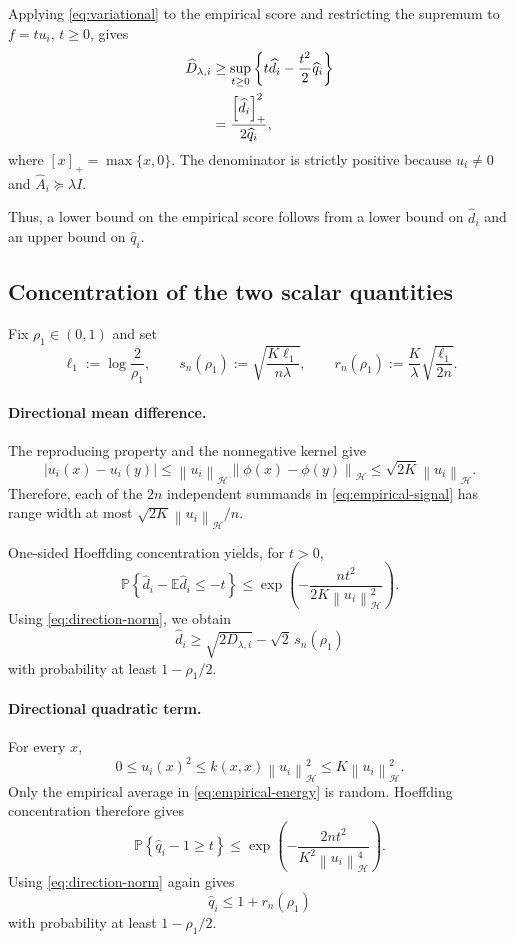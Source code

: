 \documentclass[11pt]{article}
\newcommand{\HH}{\mathcal H}
\newcommand{\E}{\mathbb E}
\newcommand{\Prob}{\mathbb P}
\newcommand{\norm}[1]{\left\lVert #1\right\rVert_{\HH}}
\newcommand{\pos}[1]{\left[#1\right]_+}
\begin{document}
Applying \eqref{eq:variational} to the empirical score
and restricting the supremum to $f=t u_i$, $t\ge0$, gives
\begin{align}
    \widehat D_{\lambda,i}
    &\ge
    \sup_{t\ge0}
    \left\{
        t\widehat d_i-\frac{t^2}{2}\widehat q_i
    \right\}
    \notag\\
    &=
    \frac{\pos{\widehat d_i}^2}{2\widehat q_i},
    \label{eq:directional-lower-bound}
\end{align}
where $[x]_+=\max\{x,0\}$.
The denominator is strictly positive because
$u_i\ne0$ and $\widehat A_i\succeq\lambda I$.

Thus, a lower bound on the empirical score follows from
a lower bound on $\widehat d_i$ and an upper bound on
$\widehat q_i$.

\subsection{Concentration of the two scalar quantities}

Fix $\rho_1\in(0,1)$ and set
\begin{equation}
    \ell_1:=\log\frac2{\rho_1},
    \qquad
    s_n(\rho_1):=
    \sqrt{\frac{K\ell_1}{n\lambda}},
    \qquad
    r_n(\rho_1):=
    \frac K\lambda\sqrt{\frac{\ell_1}{2n}}.
    \label{eq:directional-radii}
\end{equation}

\paragraph{Directional mean difference.}
The reproducing property and the nonnegative kernel give
\[
    |u_i(x)-u_i(y)|
    \le
    \norm{u_i}\norm{\phi(x)-\phi(y)}
    \le
    \sqrt{2K}\norm{u_i}.
\]
Therefore, each of the $2n$ independent summands in
\eqref{eq:empirical-signal} has range width at most
$\sqrt{2K}\norm{u_i}/n$.

One-sided Hoeffding concentration yields, for $t>0$,
\[
    \Prob\left\{
        \widehat d_i-\E\widehat d_i\le-t
    \right\}
    \le
    \exp\left(
        -\frac{nt^2}{2K\norm{u_i}^2}
    \right).
\]
Using \eqref{eq:direction-norm}, we obtain
\begin{equation}
    \widehat d_i
    \ge
    \sqrt{2D_{\lambda,i}}
    -
    \sqrt2\,s_n(\rho_1)
    \label{eq:signal-event}
\end{equation}
with probability at least $1-\rho_1/2$.

\paragraph{Directional quadratic term.}
For every $x$,
\[
    0\le u_i(x)^2
    \le k(x,x)\norm{u_i}^2
    \le K\norm{u_i}^2.
\]
Only the empirical average in
\eqref{eq:empirical-energy} is random.
Hoeffding concentration therefore gives
\[
    \Prob\left\{
        \widehat q_i-1\ge t
    \right\}
    \le
    \exp\left(
        -\frac{2nt^2}{K^2\norm{u_i}^4}
    \right).
\]
Using \eqref{eq:direction-norm} again gives
\begin{equation}
    \widehat q_i\le1+r_n(\rho_1)
    \label{eq:energy-event}
\end{equation}
with probability at least $1-\rho_1/2$.
\end{document}
